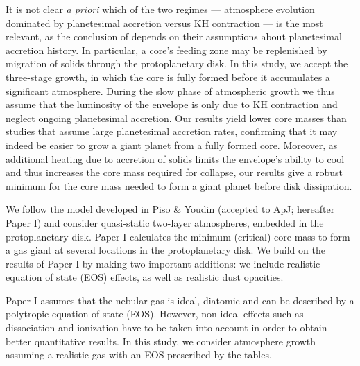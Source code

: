 \documentclass[apj]{emulateapj}
\begin{document}
It is not clear \textit{a priori} which of the two regimes --- atmosphere evolution dominated by planetesimal accretion versus KH contraction --- is the most relevant, as the conclusion of \citet{pollack96} depends on their assumptions about planetesimal accretion history. In particular, a core's feeding zone may be replenished by migration of solids through the protoplanetary disk. In this study, we accept the three-stage growth, in which the core is fully formed before it accumulates a significant atmosphere. During the slow phase of atmospheric growth we thus assume that the luminosity of the envelope is only due to KH contraction and neglect ongoing planetesimal accretion. Our results yield lower core masses than studies that assume large planetesimal accretion rates, confirming that it may indeed be easier to grow a giant planet from a fully formed core. Moreover, as additional heating due to accretion of solids limits the envelope's ability to cool and thus increases the core mass required for collapse, our results give a robust minimum for the core mass needed to form a giant planet before disk dissipation.


We follow the model developed in Piso \& Youdin (accepted to ApJ; hereafter Paper I) and consider quasi-static two-layer atmospheres, embedded in the protoplanetary disk. Paper I calculates the minimum (critical) core mass to form a gas giant at several locations in the protoplanetary disk. We build on the results of Paper I by making two important additions: we include realistic equation of state (EOS) effects, as well as realistic dust opacities.


 Paper I assumes that the nebular gas is ideal, diatomic and can be described by a polytropic equation of state (EOS). However, non-ideal effects such as dissociation and ionization have to be taken into account in order to obtain better quantitative results. In this study, we consider atmosphere growth assuming a realistic gas with an EOS prescribed by the \citet{saumon95} tables. %
 
\end{document}
